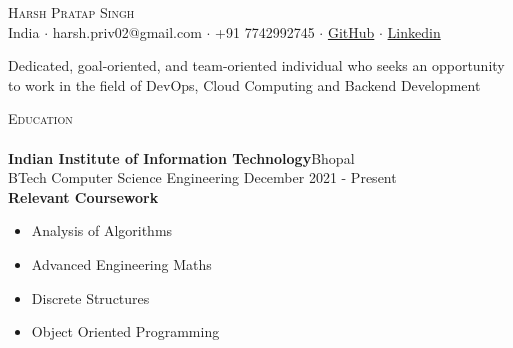 \documentclass[a4paper]{article}
\newcommand{\lineunder} {
    \vspace*{-8pt} \\
    \hspace*{-18pt} \hrulefill \\
}
\newcommand{\header} [1] {
    {\hspace*{-18pt}\vspace*{6pt} \textsc{#1}}
    \vspace*{-6pt} \lineunder
}
\begin{document}
\vspace*{-40pt}

    

\vspace*{-9pt}
\begin{center}
	{\Huge \scshape {Harsh Pratap Singh}}\\
	\vspace{2mm}
	India $\cdot$ harsh.priv02@gmail.com $\cdot$ +91 7742992745 $\cdot$ \href{https://github.com/harshh2002}{GitHub} $\cdot$ \href{https://www.linkedin.com/in/harshh2002/}{Linkedin} \\
\end{center}

\begin{center}
Dedicated, goal-oriented, and team-oriented individual who seeks an opportunity to work in the field of DevOps, Cloud Computing and Backend Development\\
\end{center}
\vspace{1mm}
\header{Education}
\vspace{0mm}
\textbf{Indian Institute of Information Technology}\hfill Bhopal\\
BTech Computer Science Engineering \hfill December 2021 - Present\\
\vspace{1mm}
\textbf{Relevant Coursework}
\vspace{-2.5mm}
 \begin{multicols}{2}
    \begin{itemize}
        \item Analysis of Algorithms
         \vspace{-2.5mm}
        \item Advanced Engineering Maths 
         \vspace{-2.5mm}
        \item Discrete Structures 
         \vspace{-2.5mm}
        \item Object Oriented Programming
         \vspace{-2.5mm}
        
    \end{itemize}
    \end{multicols}
 

\end{document}
